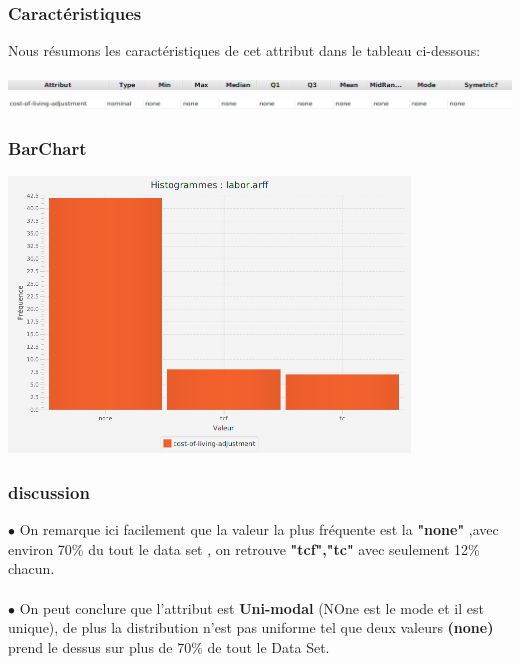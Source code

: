 \documentclass[12pt,a4paper,oneside]{book}
\begin{document}
	\subsubsection{Caractéristiques}
	Nous résumons les caractéristiques de cet attribut dans le tableau ci-dessous:
	\begin{center}
		\includegraphics[width=1\textwidth]{screens/att.png}\\ \includegraphics[width=1\textwidth]{screens/att-5.png}%
		\label{labelname}%
	\end{center}
	
	\subsubsection{BarChart}
	\begin{center}
		\includegraphics[width=0.8\textwidth]{screens/barchart/cost-of-living-adjustment-barchart.png}%
		\label{labelname}%
	\end{center}
	\subsubsection{discussion}
	$\bullet$ On remarque ici facilement que la valeur la plus fréquente est la \textbf{"none"} ,avec environ 70\% du tout le data set , on retrouve \textbf{"tcf","tc"} avec seulement 12\% chacun.\\
	\textbf{ }\\
	$\bullet$ On peut conclure que l'attribut est \textbf{Uni-modal }(NOne est le mode et il est unique), de plus la distribution n'est pas uniforme  tel que deux valeurs \textbf{(none)} prend le dessus sur plus de 70\% de tout le Data Set.
	
\end{document}
